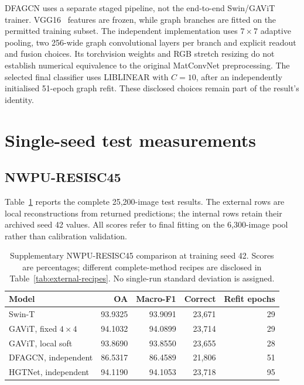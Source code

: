 DFAGCN uses a separate staged pipeline, not the end-to-end Swin/GAViT
trainer. VGG16~\cite{simonyan2015vgg} features are frozen, while graph
branches are fitted on the permitted training subset. The independent
implementation uses $7\times7$ adaptive pooling, two 256-wide graph
convolutional layers per branch and explicit readout and fusion choices.
Its torchvision weights and RGB stretch resizing do not establish numerical
equivalence to the original MatConvNet preprocessing. The selected final
classifier uses LIBLINEAR with $C=10$, after an independently initialised
51-epoch graph refit. These disclosed choices remain part of the result's
identity.

\section{Single-seed test measurements}

\subsection{NWPU-RESISC45}

Table~\ref{tab:external-nwpu} reports the complete 25,200-image test results.
The external rows are local reconstructions from returned predictions;
the internal rows retain their archived seed 42 values. All scores refer to
final fitting on the 6,300-image pool rather than calibration validation.

\begin{table}[tbp]
 \centering
 \caption{Supplementary NWPU-RESISC45 comparison at training seed 42.
 Scores are percentages; different complete-method recipes are disclosed in
 Table~\ref{tab:external-recipes}. No single-run standard deviation is assigned.}
 \label{tab:external-nwpu}
 \small
 \setlength{\tabcolsep}{5pt}
 \begin{tabular}{lrrrr}
  \toprule
  Model & OA & Macro-F1 & Correct & Refit epochs\\
  \midrule
  Swin-T & 93.9325 & 93.9091 & 23,671 & 29\\
  GAViT, fixed $4\times4$ & 94.1032 & 94.0899 & 23,714 & 29\\
  GAViT, local soft & 93.8690 & 93.8550 & 23,655 & 28\\
  DFAGCN, independent & 86.5317 & 86.4589 & 21,806 & 51\\
  HGTNet, independent & 94.1190 & 94.1053 & 23,718 & 95\\
  \bottomrule
 \end{tabular}
\end{table}

